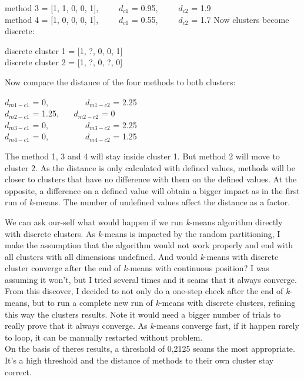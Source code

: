 \documentclass[12pt]{article}
\newcommand{\code}[1]{{\fontfamily{phv}\selectfont \small{\begin{tabbing} #1 \end{tabbing}}}}
\begin{document}
\begin{enumerate}
{method 3 = [1, 1, 0, 0, 1],\ \ \ \ \ $d_{c1}$ = 0.95,\ \ \ \ \  $d_{c2}$ = 1.9\\
method 4 = [1, 0, 0, 0, 1],\ \ \ \ \ $d_{c1}$ = 0.55,\ \ \ \ \  $d_{c2}$ = 1.7}
\newpage
Now clusters become discrete: \code{
discrete cluster 1 = [1, ?, 0, 0, 1]\\
discrete cluster 2 = [1, ?, 0, ?, 0]}
Now compare the distance of the four methods to both clusters: \code{
 $d_{m1-c1}$ = 0,\ \ \ \ \ \ \ \ \ $d_{m1-c2}$ = 2.25\\
$d_{m2-c1}$ = 1.25, \ \ \ $d_{m2-c2}$ = 0\\
$d_{m3-c1}$ = 0,\ \ \ \ \ \ \ \ \ $d_{m3-c2}$ = 2.25\\
$d_{m4-c1}$ = 0,\ \ \ \ \ \ \ \ \ $d_{m4-c2}$ = 1.25}
The method 1, 3 and 4 will stay inside cluster 1. But method 2 will move to cluster 2. As the distance is only calculated with defined values, methods will be closer to clusters that have no difference with them on the defined values. At the opposite, a difference on a defined value will obtain a bigger impact as in the first run of \textit{k}-means. The number of undefined values affect the distance as a factor.
\end{enumerate}
We can ask our-self what would happen if we run \textit{k}-means algorithm directly with discrete clusters. As \textit{k}-means is impacted by the random partitioning, I make the assumption that the algorithm would not work properly and end with all clusters with all dimensions undefined. And would \textit{k}-means with discrete cluster converge after the end of \textit{k}-means with continuous position? I was assuming it won't, but I tried several times and it seams that it always converge. From this discover, I decided to not only do a one-step check after the end of \textit{k}-means, but to run a complete new run of \textit{k}-means with discrete clusters, refining this way the clusters results. Note it would need a bigger number of trials to really prove that it always converge. As \textit{k}-means converge fast, if it happen rarely to loop, it can be manually restarted without problem.\\
On the basis of theres results, a threshold of 0,2125 seams the most appropriate. It's a high threshold and the distance of methods to their own cluster stay correct.
\end{document}
